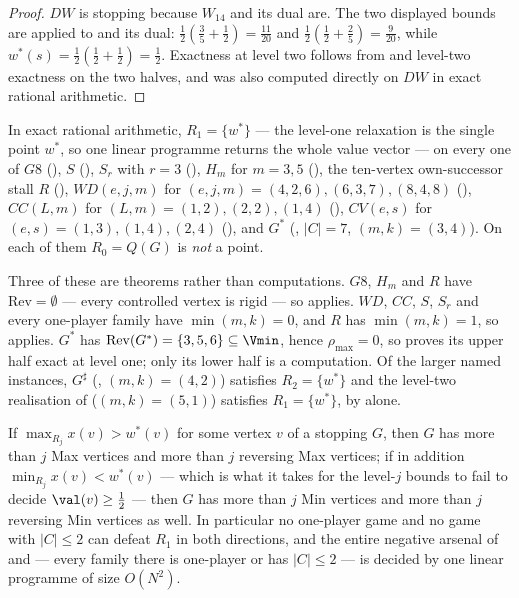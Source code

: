 \begin{proof}
$DW$ is stopping because $W_{14}$ and its dual are. The two displayed bounds
are  applied to  and its dual:
$\frac12(\frac35+\frac12)=\frac{11}{20}$ and
$\frac12(\frac12+\frac25)=\frac9{20}$, while
$w^{\ast}(s)=\frac12(\frac12+\frac12)=\frac12$. Exactness at level two follows
from  and level-two exactness on the two halves, and was also
computed directly on $DW$ in exact rational arithmetic.
\end{proof}

\begin{proposition}
\label{cl:families}
In exact rational arithmetic, $R_1=\{w^{\ast}\}$ --- the level-one relaxation
is the single point $w^{\ast}$, so one linear programme returns the whole value
vector --- on every one of
$G8$ (), $S$ (),
$S_r$ with $r=3$ (), $H_m$ for $m=3,5$
(), the ten-vertex own-successor stall $R$
(), $WD(e,j,m)$ for
$(e,j,m)=(4,2,6),(6,3,7),(8,4,8)$ (), $CC(L,m)$ for
$(L,m)=(1,2),(2,2),(1,4)$ (), $CV(e,s)$ for
$(e,s)=(1,3),(1,4),(2,4)$ (), and $G^{\ast}$
(, $|C|=7$, $(m,k)=(3,4)$). On each of them
$R_0=Q(G)$ is \emph{not} a point.

Three of these are theorems rather than computations. $G8$, $H_m$ and $R$ have
$\mathrm{Rev}=\emptyset$ --- every controlled vertex is rigid --- so 
applies. $WD$, $CC$, $S$, $S_r$ and every one-player family have
$\min(m,k)=0$, and $R$ has $\min(m,k)=1$, so  applies.
$G^{\ast}$ has $\mathrm{Rev}(G^{\ast})=\{3,5,6\}\subseteq\Vmin$, hence
$\rho_{\max}=0$, so  proves its upper half exact at level
one; only its lower half is a computation. Of the larger named instances,
$G^{\sharp}$ (, $(m,k)=(4,2)$) satisfies
$R_2=\{w^{\ast}\}$ and the level-two realisation of 
($(m,k)=(5,1)$) satisfies $R_1=\{w^{\ast}\}$, by  alone.
\end{proposition}

\begin{corollary}
\label{cl:barrier}
If $\max_{R_j}x(v)>w^{\ast}(v)$ for some vertex $v$ of a stopping $G$, then
$G$ has more than $j$ Max vertices and more than $j$ reversing Max vertices;
if in addition $\min_{R_j}x(v)<w^{\ast}(v)$ --- which is what it takes for the
level-$j$ bounds to fail to decide $\val(v)\ge\frac12$ --- then $G$ has more
than $j$ Min vertices and more than $j$ reversing Min vertices as well. In
particular no one-player game and no game with $|C|\le2$ can defeat
$R_1$ in both directions, and the entire negative arsenal of
 and  --- every family there is one-player or has
$|C|\le2$ --- is decided by one linear programme of size $O(N^{2})$.
\end{corollary}

